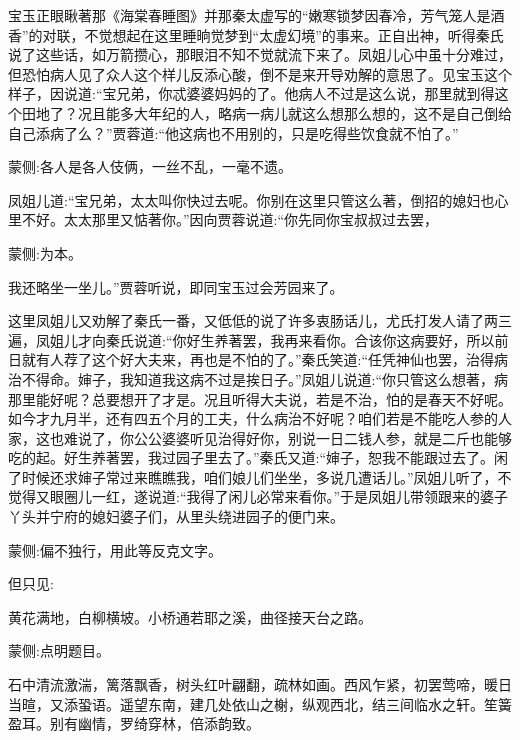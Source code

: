 \begin{parag}
    宝玉正眼瞅著那《海棠春睡图》并那秦太虚写的“嫩寒锁梦因春冷，芳气笼人是酒香”的对联，不觉想起在这里睡晌觉梦到“太虚幻境”的事来。正自出神，听得秦氏说了这些话，如万箭攒心，那眼泪不知不觉就流下来了。凤姐儿心中虽十分难过，但恐怕病人见了众人这个样儿反添心酸，倒不是来开导劝解的意思了。见宝玉这个样子，因说道:“宝兄弟，你忒婆婆妈妈的了。他病人不过是这么说，那里就到得这个田地了？况且能多大年纪的人，略病一病儿就这么想那么想的，这不是自己倒给自己添病了么？”贾蓉道:“他这病也不用别的，只是吃得些饮食就不怕了。”\begin{note}蒙侧:各人是各人伎俩，一丝不乱，一毫不遗。\end{note}凤姐儿道:“宝兄弟，太太叫你快过去呢。你别在这里只管这么著，倒招的媳妇也心里不好。太太那里又惦著你。”因向贾蓉说道:“你先同你宝叔叔过去罢，\begin{note}蒙侧:为本。\end{note}我还略坐一坐儿。”贾蓉听说，即同宝玉过会芳园来了。
\end{parag}


\begin{parag}
    这里凤姐儿又劝解了秦氏一番，又低低的说了许多衷肠话儿，尤氏打发人请了两三遍，凤姐儿才向秦氏说道:“你好生养著罢，我再来看你。合该你这病要好，所以前日就有人荐了这个好大夫来，再也是不怕的了。”秦氏笑道:“任凭神仙也罢，治得病治不得命。婶子，我知道我这病不过是挨日子。”凤姐儿说道:“你只管这么想著，病那里能好呢？总要想开了才是。况且听得大夫说，若是不治，怕的是春天不好呢。如今才九月半，还有四五个月的工夫，什么病治不好呢？咱们若是不能吃人参的人家，这也难说了，你公公婆婆听见治得好你，别说一日二钱人参，就是二斤也能够吃的起。好生养著罢，我过园子里去了。”秦氏又道:“婶子，恕我不能跟过去了。闲了时候还求婶子常过来瞧瞧我，咱们娘儿们坐坐，多说几遭话儿。”凤姐儿听了，不觉得又眼圈儿一红，遂说道:“我得了闲儿必常来看你。”于是凤姐儿带领跟来的婆子丫头并宁府的媳妇婆子们，从里头绕进园子的便门来。\begin{note}蒙侧:偏不独行，用此等反克文字。\end{note}但只见:
\end{parag}


\begin{qute2sp}
    黄花满地，白柳横坡。小桥通若耶之溪，曲径接天台之路。\begin{note}蒙侧:点明题目。\end{note}石中清流激湍，篱落飘香，树头红叶翩翻，疏林如画。西风乍紧，初罢莺啼，暖日当暄，又添蛩语。遥望东南，建几处依山之榭，纵观西北，结三间临水之轩。笙簧盈耳。别有幽情，罗绮穿林，倍添韵致。
\end{qute2sp}


